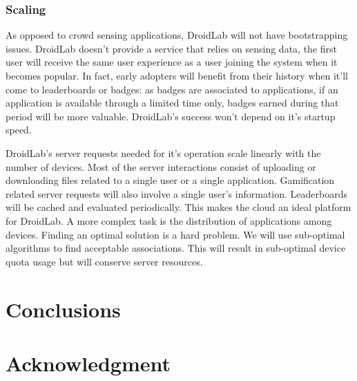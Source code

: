 \documentclass[conference,letterpaper]{IEEEtran}
\begin{document}
\subsubsection{Scaling}
As opposed to crowd sensing applications, DroidLab will not have bootstrapping issues. DroidLab doesn't provide a service that relies on sensing data, the first user will receive the same user experience as a user joining the system when it becomes popular. In fact, early adopters will benefit from their history when it'll come to leaderboards or badges: as badges are associated to applications, if an application is available through a limited time only, badges earned during that period will be more valuable. DroidLab's success won't depend on it's startup speed.

DroidLab's server requests needed for it's operation scale linearly with the number of devices. Most of the server interactions consist of uploading or downloading files related to a single user or a single application. Gamification related server requests will also involve a single user's information. Leaderboards will be cached and evaluated periodically. This makes the cloud an ideal platform for DroidLab. A more complex task is the distribution of applications among devices. Finding an optimal solution is a hard problem. We will use sub-optimal algorithms to find acceptable associations. This will result in sub-optimal device quota usage but will conserve server resources.

\section{Conclusions}
\label{sec:conclusion_and_future_work}
\cite{IEEEexample:softonline}
\section{Acknowledgment}
\label{sec:acknowledgment}


\end{document}
